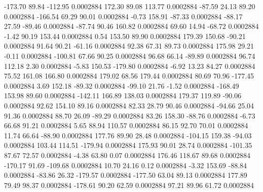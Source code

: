      -173.70       89.84     -112.95     0.0002884
      172.30       89.08      113.77     0.0002884
      -87.59       24.13       89.20     0.0002884
     -166.54       69.29       90.01     0.0002884
       -0.73      158.91      -87.33     0.0002884
      -88.17       27.59      -89.46     0.0002884
      -87.74       90.46      160.82     0.0002884
       69.60       14.94      -68.72     0.0002884
       -1.42       90.19      153.44     0.0002884
        0.54      153.50       89.90     0.0002884
      179.39      150.68      -90.21     0.0002884
       91.64       90.21      -61.16     0.0002884
       92.38       67.31       89.73     0.0002884
      175.98       29.21       -0.11     0.0002884
     -100.81       67.66       90.25     0.0002884
       96.68       66.14      -89.89     0.0002884
       96.74      112.18        2.30     0.0002884
       -5.83      150.53     -179.80     0.0002884
       -6.92       13.23       84.27     0.0002884
       75.52      161.08      166.80     0.0002884
      179.02       68.56      179.44     0.0002884
       80.69       70.96     -177.45     0.0002884
        3.69      152.18      -89.32     0.0002884
      -99.10       21.76       -1.52     0.0002884
     -168.49      153.98       89.60     0.0002884
     -142.11      166.89      138.03     0.0002884
      179.37      119.89      -90.06     0.0002884
       92.62      154.10       89.16     0.0002884
       82.33       28.79       90.46     0.0002884
      -94.66       25.04       91.36     0.0002884
       88.70       26.09      -89.29     0.0002884
       83.26      158.30      -88.76     0.0002884
       -6.73       66.68       91.21     0.0002884
        5.65       88.94      110.57     0.0002884
       86.15       92.70       70.01     0.0002884
       11.74       66.64      -88.90     0.0002884
      177.76       89.90       28.48     0.0002884
     -104.15      159.38      -94.03     0.0002884
      103.44      114.51     -179.94     0.0002884
      175.93       90.01       28.74     0.0002884
     -101.35       87.67       72.57     0.0002884
       -4.38       63.80        0.07     0.0002884
      176.46      118.67       89.68     0.0002884
     -170.17       91.69     -109.68     0.0002884
       10.70       24.16        0.12     0.0002884
       -3.32      153.69      -88.84     0.0002884
      -83.86       26.32     -179.57     0.0002884
     -177.50       63.04       89.13     0.0002884
      177.89       79.49       98.37     0.0002884
     -178.61       90.20       62.59     0.0002884
       97.21       89.96       61.72     0.0002884
